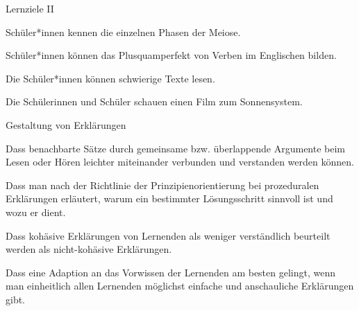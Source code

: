 \begin{multiple-choice}{Lernziele II}
    \begin{answers}
        \item[\correct] Schüler*innen kennen die einzelnen Phasen der Meiose.
        \item[\correct] Schüler*innen können das Plusquamperfekt von Verben im Englischen bilden.
        \item[\wrong] Die Schüler*innen können schwierige Texte lesen.
        \item[\wrong] Die Schülerinnen und Schüler schauen einen Film zum Sonnensystem.   
    \end{answers}
\end{multiple-choice}

\begin{multiple-choice}{Gestaltung von Erklärungen}
    \begin{answers}
        \item[\correct] Dass benachbarte Sätze durch gemeinsame bzw. überlappende Argumente beim Lesen oder Hören leichter miteinander verbunden und verstanden werden können.
        \item[\correct] Dass man nach der Richtlinie der Prinzipienorientierung bei prozeduralen Erklärungen erläutert, warum ein bestimmter Lösungsschritt sinnvoll ist und wozu er dient.
        \item[\wrong] Dass kohäsive Erklärungen von Lernenden als weniger verständlich beurteilt werden als nicht-kohäsive Erklärungen.
        \item[\wrong] Dass eine Adaption an das Vorwissen der Lernenden am besten gelingt, wenn man einheitlich allen Lernenden möglichst einfache und anschauliche Erklärungen gibt.
    \end{answers}
\end{multiple-choice}

